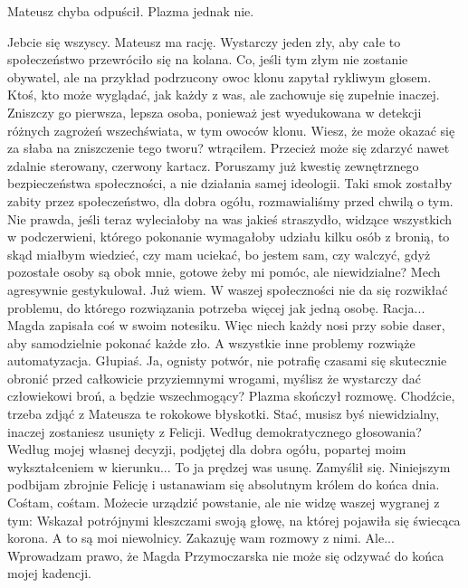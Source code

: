 Mateusz chyba odpuścił. Plazma jednak nie.
\begin{dialogue}
\ds{} Jebcie się wszyscy. Mateusz ma rację. Wystarczy jeden zły, aby całe to społeczeństwo przewróciło się na kolana. 
Co, jeśli tym złym nie zostanie obywatel, ale na przykład podrzucony owoc klonu \dm{} zapytał rykliwym głosem. \dm{} Ktoś, kto może wyglądać, jak każdy z was, ale zachowuje się zupełnie inaczej.
\ds{} Zniszczy go pierwsza, lepsza osoba, ponieważ jest wyedukowana w detekcji różnych zagrożeń wszechświata, w tym owoców klonu.
\ds{} Wiesz, że może okazać się za słaba na zniszczenie tego tworu? \dm{} wtrąciłem. \dm{} Przecież może się zdarzyć nawet zdalnie sterowany, czerwony kartacz.
\ds{} Poruszamy już kwestię zewnętrznego bezpieczeństwa społeczności, a nie działania samej ideologii. 
Taki smok zostałby zabity przez społeczeństwo, dla dobra ogółu, rozmawialiśmy przed chwilą o tym.
\ds{} Nie prawda, jeśli teraz wyleciałoby na was jakieś straszydło, widzące wszystkich w podczerwieni, którego pokonanie wymagałoby udziału kilku osób z bronią, to skąd miałbym wiedzieć, czy mam uciekać, bo jestem sam, czy walczyć, gdyż pozostałe osoby są obok mnie, gotowe żeby mi pomóc, ale niewidzialne? \dm{} Mech agresywnie gestykulował. \dm{} 
Już wiem. W waszej społeczności nie da się rozwikłać problemu, do którego rozwiązania potrzeba więcej jak jedną osobę.
\ds{} Racja... \dm{} Magda zapisała coś w swoim notesiku. \dm{} Więc niech każdy nosi przy sobie daser, aby samodzielnie pokonać każde zło. A wszystkie inne problemy rozwiąże automatyzacja.
\ds{} Głupiaś. Ja, ognisty potwór, nie potrafię czasami się skutecznie obronić przed całkowicie przyziemnymi wrogami, myślisz że wystarczy dać człowiekowi broń, a będzie wszechmogący? \dm{} 
Plazma skończył rozmowę. \dm{} Chodźcie, trzeba zdjąć z Mateusza te rokokowe błyskotki.
\ds{} Stać, musisz byś niewidzialny, inaczej zostaniesz usunięty z Felicji.
\ds{} Według demokratycznego głosowania?
\ds{} Według mojej własnej decyzji, podjętej dla dobra ogółu, popartej moim wykształceniem w kierunku...
\ds{} To ja prędzej was usunę. \dm{} Zamyślił się. \dm{} Niniejszym podbijam zbrojnie Felicję i ustanawiam się absolutnym królem do końca dnia. Cośtam, cośtam. 
Możecie urządzić powstanie, ale nie widzę waszej wygranej z tym: \dm{} Wskazał potrójnymi kleszczami swoją głowę, na której pojawiła się świecąca korona. \dm{} 
A to są moi niewolnicy. Zakazuję wam rozmowy z nimi.
\ds{} Ale...
\ds{} Wprowadzam prawo, że Magda Przymoczarska nie może się odzywać do końca mojej kadencji.
\end{dialogue}

